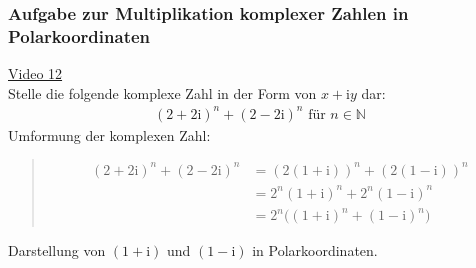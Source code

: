 \subsubsection{ Aufgabe zur Multiplikation komplexer Zahlen in Polarkoordinaten}
\href{https://youtu.be/JumERKyIWbM}{Video 12}\\
Stelle die folgende komplexe Zahl in der Form von $ x+\mathrm{i}y $ dar:\\
\begin{align*}
(2+2\mathrm{i})^n+(2-2\mathrm{i})^n \text{ für } n\in \mathbb{N}
\end{align*}
\newpage
\noindent
\textbullet \;\; Umformung der komplexen Zahl:\\
\begin{quote}
	\begin{align*}
	(2+2\mathrm{i})^n+(2-2\mathrm{i})^n&=(2(1+\mathrm{i}))^n+(2(1-\mathrm{i}))^n\\
	                 &=2^n(1+\mathrm{i})^n+2^n(1-\mathrm{i})^n\\
	                 &=2^n \big((1+\mathrm{i})^n+(1-\mathrm{i})^n  \big)
	\end{align*}
\end{quote}
\textbullet \;\; Darstellung von $ (1+\mathrm{i}) $ und $ (1-\mathrm{i}) $ in Polarkoordinaten.\\
